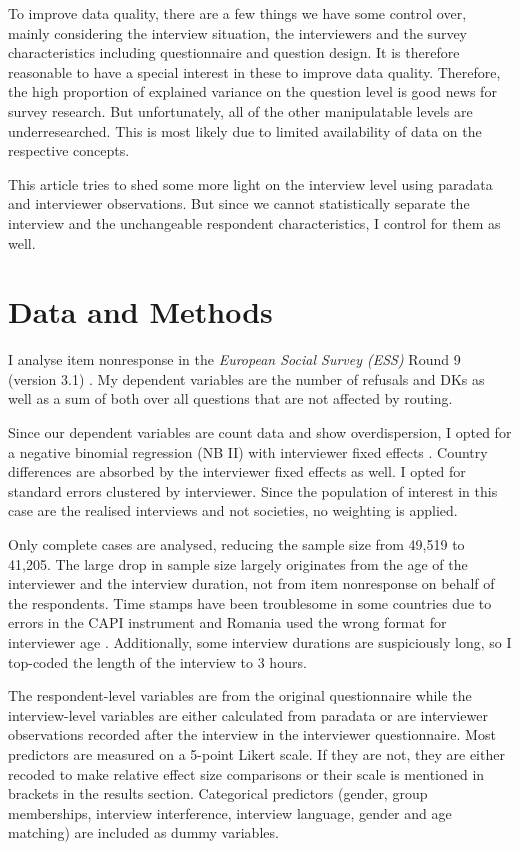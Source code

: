 \documentclass[a4paper,12pt]{article}
\begin{document}
\bigskip

To improve data quality, there are a few things we have some control over, mainly considering the interview situation, the interviewers and the survey characteristics including questionnaire and question design. It is therefore reasonable to have a special interest in these to improve data quality. Therefore, the high proportion of explained variance on the question level is good news for survey research. But unfortunately, all of the other manipulatable levels are underresearched. This is most likely due to limited availability of data on the respective concepts.

This article tries to shed some more light on the interview level using paradata and interviewer observations. But since we cannot statistically separate the interview and the unchangeable respondent characteristics, I control for them as well.


\section{Data and Methods}

I analyse item nonresponse in the \textit{European Social Survey (ESS)} Round 9 (version 3.1) \citep{essericEuropeanSocialSurvey2019}. My dependent variables are the number of refusals and DKs as well as a sum of both over all questions that are not affected by routing. 

Since our dependent variables are count data and show overdispersion, I opted for a negative binomial regression (NB II) with interviewer fixed effects \citep{allisonFixedEffectsNegativeBinomial2002}. Country differences are absorbed by the interviewer fixed effects as well. I opted for standard errors clustered by interviewer. Since the population of interest in this case are the realised interviews and not societies, no weighting is applied. 

Only complete cases are analysed, reducing the sample size from 49,519 to 41,205. The large drop in sample size largely originates from the age of the interviewer and the interview duration, not from item nonresponse on behalf of the respondents. Time stamps have been troublesome in some countries due to errors in the CAPI instrument and Romania used the wrong format for interviewer age \citep{essericESS9CodebookEd2021}. Additionally, some interview durations are suspiciously long, so I top-coded the length of the interview to 3 hours.

The respondent-level variables are from the original questionnaire while the interview-level variables are either calculated from paradata or are interviewer observations recorded after the interview in the interviewer questionnaire. Most predictors are measured on a 5-point Likert scale. If they are not, they are either recoded to make relative effect size comparisons or their scale is mentioned in brackets in the results section. Categorical predictors (gender, group memberships, interview interference, interview language, gender and age matching) are included as dummy variables.
\end{document}
